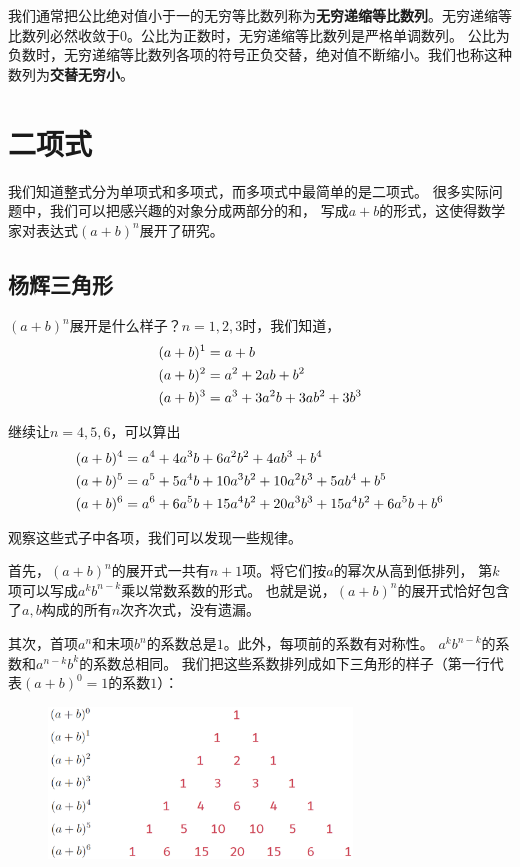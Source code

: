 \documentclass[12pt,UTF8]{ctexbook}
\newtheorem{sk}{思考}[section]
\begin{document}
我们通常把公比绝对值小于一的无穷等比数列称为\textbf{无穷递缩等比数列}。无穷递缩等比数列必然收敛于$0$。公比为正数时，无穷递缩等比数列是严格单调数列。
公比为负数时，无穷递缩等比数列各项的符号正负交替，绝对值不断缩小。我们也称这种数列为\textbf{交替无穷小}。
    

\chapter{二项式}

我们知道整式分为单项式和多项式，而多项式中最简单的是二项式。
很多实际问题中，我们可以把感兴趣的对象分成两部分的和，
写成$a+b$的形式，这使得数学家对表达式$(a+b)^n$展开了研究。

\section{杨辉三角形}

$(a+b)^n$展开是什么样子？$n=1,2,3$时，我们知道，
\begin{align}
 (a + b)^1 &= a + b \notag \\
 (a + b)^2 &= a^2 + 2ab + b^2 \notag \\
 (a + b)^3 &= a^3 + 3a^2b + 3ab^2 + 3b^3 \notag 
\end{align}

继续让$n=4,5,6$，可以算出
\begin{align}
 (a + b)^4 &= a^4 + 4a^3b + 6a^2b^2 + 4ab^3 + b^4 \notag \\
 (a + b)^5 &= a^5 + 5a^4b + 10a^3b^2 + 10a^2b^3 + 5ab^4 + b^5 \notag \\
 (a + b)^6 &= a^6 + 6a^5b + 15a^4b^2 + 20a^3b^3 + 15a^4b^2 + 6a^5b + b^6 \notag 
\end{align}

观察这些式子中各项，我们可以发现一些规律。

首先，$(a+b)^n$的展开式一共有$n+1$项。将它们按$a$的幂次从高到低排列，
第$k$项可以写成$a^kb^{n-k}$乘以常数系数的形式。
也就是说，$(a+b)^n$的展开式恰好包含了$a,b$构成的所有$n$次齐次式，没有遗漏。

其次，首项$a^n$和末项$b^n$的系数总是$1$。此外，每项前的系数有对称性。
$a^kb^{n-k}$的系数和$a^{n-k}b^k$的系数总相同。
我们把这些系数排列成如下三角形的样子（第一行代表$(a+b)^0=1$的系数$1$）：

\begin{figure}[h] %
    \vspace{-14pt}
    \centering
    \includegraphics[width=0.72\textwidth]{二项式1.png}
\end{figure}
\end{document}
